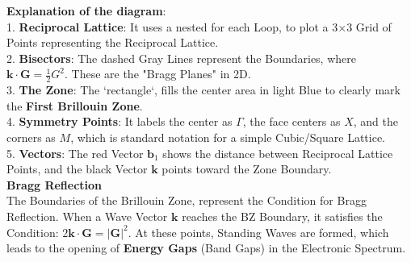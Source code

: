 \documentclass[a4paper, 10pt, onepage]{elegantbook}
\begin{document}
{

   \textbf{Explanation of the diagram}:  \\
1.  \textbf{Reciprocal Lattice}: It uses a nested for each Loop, to plot a 3$\times$3 Grid of Points representing the Reciprocal Lattice.  \\
2.  \textbf{Bisectors}: The dashed Gray Lines represent the Boundaries, where $\mathbf{k} \cdot \mathbf{G} = \frac{1}{2}G^2$. These are the "Bragg Planes" in 2D.  \\
3.  \textbf{The Zone}: The `rectangle`, fills the center area in light Blue to clearly mark the \textbf{First Brillouin Zone}.  \\
4.  \textbf{Symmetry Points}: It labels the center as $\Gamma$, the face centers as $X$, and the corners as $M$, which is standard notation for a simple Cubic/Square Lattice.  \\
5.  \textbf{Vectors}: The red Vector $\mathbf{b}_1$ shows the distance between Reciprocal Lattice Points, and the black Vector $\mathbf{k}$ points toward the Zone Boundary.  \\

    \textbf{Bragg Reflection}  \\

The Boundaries of the Brillouin Zone, represent the Condition for Bragg Reflection. When a Wave Vector $\mathbf{k}$ reaches the BZ Boundary, it satisfies the Condition:
$ 2\mathbf{k} \cdot \mathbf{G} = |\mathbf{G}|^2$.
At these points, Standing Waves are formed, which leads to the opening of \textbf{Energy Gaps} (Band Gaps) in the Electronic Spectrum.









}
\end{document}
